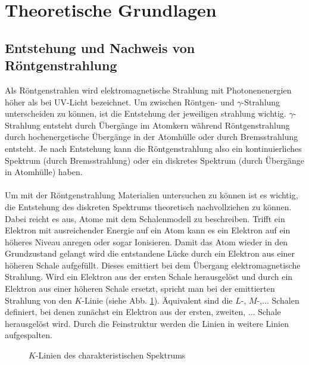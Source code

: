 \section{Theoretische Grundlagen}
\subsection{Entstehung und Nachweis von Röntgenstrahlung}
Als Röntgenstrahlen wird elektromagnetische Strahlung mit Photonenenergien höher als bei UV-Licht bezeichnet. Um zwischen Röntgen- und $\gamma$-Strahlung unterscheiden zu können, ist die Entstehung der jeweiligen strahlung wichtig. $\gamma$-Strahlung entsteht durch Übergänge im Atomkern während Röntgenstrahlung durch hochenergetische Übergänge in der Atomhülle oder durch Bremsstrahlung entsteht. Je nach Entstehung kann die Röntgenstrahlung also ein kontinuierliches Spektrum (durch Bremsstrahlung) oder ein diskretes Spektrum (durch Übergänge in Atomhülle) haben.\\ \\
Um mit der Röntgenstrahlung Materialien untersuchen zu können ist es wichtig, die Entstehung des diskreten Spektrums theoretisch nachvollziehen zu können. Dabei reicht es aus, Atome mit dem Schalenmodell zu beschreiben. Trifft ein Elektron mit ausreichender Energie auf ein Atom kann es ein Elektron auf ein höheres Niveau anregen oder sogar Ionisieren. Damit das Atom wieder in den Grundzustand gelangt wird die entstandene Lücke durch ein Elektron aus einer höheren Schale aufgefüllt. Dieses emittiert bei dem Übergang elektromagnetische Strahlung. Wird ein Elektron aus der ersten Schale herausgelöst und durch ein Elektron aus einer höheren Schale ersetzt, spricht man bei der emittierten Strahlung von den $K$-Linie (siehe Abb. \ref{fig:k_linien}). Äquivalent sind die $L$-, $M$-,... Schalen definiert, bei denen zunächst ein Elektron aus der ersten, zweiten, ... Schale herausgelöst wird. Durch die Feinstruktur werden die Linien in weitere Linien aufgespalten.
\begin{figure}[h]
  \centering
  \caption{$K$-Linien des charakteristischen Spektrums}
  \label{fig:k_linien}
\end{figure}

